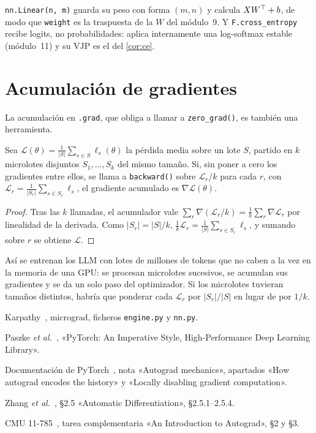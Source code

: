 \begin{observacion}
\texttt{nn.Linear(n, m)} guarda su peso con forma $(m,n)$ y calcula $XW^{\top}+b$, de modo que \texttt{weight} es la traspuesta de la $W$ del módulo~9. Y \texttt{F.cross\_entropy} recibe logits, no probabilidades: aplica internamente una log-softmax estable (módulo~11) y su VJP es el del \cref{cor:ce}.
\end{observacion}

\section{Acumulación de gradientes}

La acumulación en \texttt{.grad}, que obliga a llamar a \texttt{zero\_grad()}, es también una herramienta.

\begin{proposicion}[Microlotes]\label{prop:microlotes}
Sea $\mathcal L(\theta)=\frac1{|S|}\sum_{s\in S}\ell_s(\theta)$ la pérdida media sobre un lote $S$, partido en $k$ microlotes disjuntos $S_1,\dots,S_k$ del mismo tamaño. Si, sin poner a cero los gradientes entre ellos, se llama a \texttt{backward()} sobre $\mathcal L_r/k$ para cada $r$, con $\mathcal L_r=\frac1{|S_r|}\sum_{s\in S_r}\ell_s$, el gradiente acumulado es $\nabla\mathcal L(\theta)$.
\end{proposicion}

\begin{proof}
Tras las $k$ llamadas, el acumulador vale $\sum_r\nabla(\mathcal L_r/k)=\frac1k\sum_r\nabla\mathcal L_r$ por linealidad de la derivada. Como $|S_r|=|S|/k$, $\frac1k\mathcal L_r=\frac1{|S|}\sum_{s\in S_r}\ell_s$, y sumando sobre $r$ se obtiene $\mathcal L$.
\end{proof}

Así se entrenan los LLM con lotes de millones de tokens que no caben a la vez en la memoria de una GPU: se procesan microlotes sucesivos, se acumulan sus gradientes y se da un solo paso del optimizador. Si los microlotes tuvieran tamaños distintos, habría que ponderar cada $\mathcal L_r$ por $|S_r|/|S|$ en lugar de por $1/k$.

\begin{lecturas}
\item Karpathy~\cite{karpathy}, micrograd, ficheros \texttt{engine.py} y \texttt{nn.py}.
\item Paszke \emph{et al.}~\cite{paszke}, «PyTorch: An Imperative Style, High-Performance Deep Learning Library».
\item Documentación de PyTorch~\cite{pytorch}, nota «Autograd mechanics», apartados «How autograd encodes the history» y «Locally disabling gradient computation».
\item Zhang \emph{et al.}~\cite{d2l}, §2.5 «Automatic Differentiation», §2.5.1--2.5.4.
\item CMU 11-785~\cite{cmu11785}, tarea complementaria «An Introduction to Autograd», §2 y §3.
\end{lecturas}

